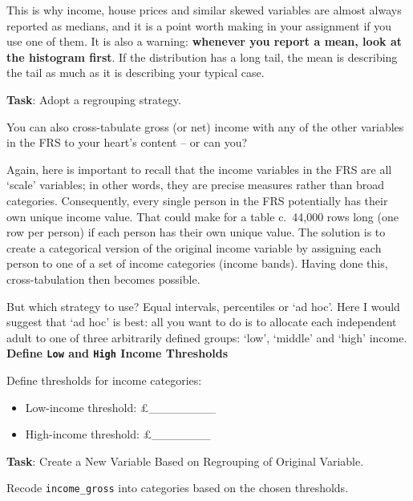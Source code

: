 \documentclass[
  letterpaper,
  DIV=11,
  numbers=noendperiod]{scrreprt}
\providecommand{\tightlist}{%
  \setlength{\itemsep}{0pt}\setlength{\parskip}{0pt}}
\begin{document}
This is why income, house prices and similar skewed variables are almost
always reported as medians, and it is a point worth making in your
assignment if you use one of them. It is also a warning:
\textbf{whenever you report a mean, look at the histogram first}. If the
distribution has a long tail, the mean is describing the tail as much as
it is describing your typical case.

\textbf{Task}: Adopt a regrouping strategy.

You can also cross-tabulate gross (or net) income with any of the other
variables in the FRS to your heart's content -- or can you?

Again, here is important to recall that the income variables in the FRS
are all `scale' variables; in other words, they are precise measures
rather than broad categories. Consequently, every single person in the
FRS potentially has their own unique income value. That could make for a
table c.~44,000 rows long (one row per person) if each person has their
own unique value. The solution is to create a categorical version of the
original income variable by assigning each person to one of a set of
income categories (income bands). Having done this, cross-tabulation
then becomes possible.

But which strategy to use? Equal intervals, percentiles or `ad hoc'.
Here I would suggest that `ad hoc' is best: all you want to do is to
allocate each independent adult to one of three arbitrarily defined
groups: `low', `middle' and `high' income. \textbf{Define \texttt{Low}
and \texttt{High} Income Thresholds}

Define thresholds for income categories:

\begin{itemize}
\tightlist
\item
  Low-income threshold: £\_\_\_\_\_\_\_\_
\item
  High-income threshold: £\_\_\_\_\_\_\_
\end{itemize}

\textbf{Task}: Create a New Variable Based on Regrouping of Original
Variable.

Recode \texttt{income\_gross} into categories based on the chosen
thresholds.
\end{document}
